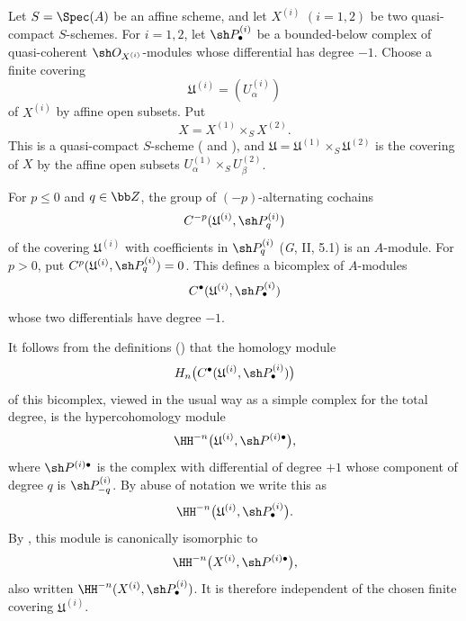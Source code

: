 \begin{env}[6.6.1]
\label{III.6.6.1}
Let $S=\Spec(A)$ be an affine scheme, and let $X^{(i)}$
$(i=1,2)$ be two quasi-compact $S$-schemes.  For $i=1,2$, let
$\sh P_\bullet^{(i)}$ be a bounded-below complex of
quasi-coherent $\sh O_{X^{(i)}}$-modules whose differential has
degree $-1$.  Choose a finite covering
\[
  \mathfrak U^{(i)}=(U_\alpha^{(i)})
\]
of $X^{(i)}$ by affine open subsets.  Put
\[
  X=X^{(1)}\times_SX^{(2)}.
\]
This is a quasi-compact $S$-scheme
( and ), and
$\mathfrak U=\mathfrak U^{(1)}\times_S\mathfrak U^{(2)}$ is the
covering of $X$ by the affine open subsets
$U_\alpha^{(1)}\times_SU_\beta^{(2)}$.

For $p\leq0$ and $q\in\bb Z$, the group of $(-p)$-alternating
cochains
\[
  C^{-p}(\mathfrak U^{(i)},\sh P_q^{(i)})
\]
of the covering $\mathfrak U^{(i)}$ with coefficients in
$\sh P_q^{(i)}$ (\emph{G}, II, 5.1) is an $A$-module.  For
$p>0$, put
$C^p(\mathfrak U^{(i)},\sh P_q^{(i)})=0$.  This defines a
bicomplex of $A$-modules
\[
  C^\bullet(\mathfrak U^{(i)},\sh P_\bullet^{(i)})
\]
whose two differentials have degree $-1$.

It follows from the definitions () that the
homology module
\[
  H_n\bigl(C^\bullet
    (\mathfrak U^{(i)},\sh P_\bullet^{(i)})\bigr)
\]
of this bicomplex, viewed in the usual way as a simple complex
for the total degree, is the hypercohomology module
\[
  \HH^{-n}
  \bigl(\mathfrak U^{(i)},\sh P^{(i)\bullet}\bigr),
\]
where $\sh P^{(i)\bullet}$ is the complex with differential of
degree $+1$ whose component of degree $q$ is
$\sh P_{-q}^{(i)}$.  By abuse of notation we write this as
\[
  \HH^{-n}
  \bigl(\mathfrak U^{(i)},\sh P_\bullet^{(i)}\bigr).
\]
By , this module is canonically isomorphic to
\[
  \HH^{-n}\bigl(X^{(i)},\sh P^{(i)\bullet}\bigr),
\]
also written
$\HH^{-n}(X^{(i)},\sh P_\bullet^{(i)})$.  It is therefore
independent of the chosen finite covering
$\mathfrak U^{(i)}$.
\end{env}

